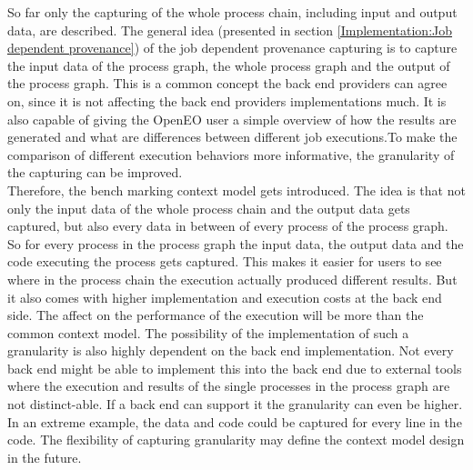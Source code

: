 \documentclass[draft,final]{vutinfth} %
\begin{document}
So far only the capturing of the whole process chain, including input and output data, are described. The general idea (presented in section \ref{Implementation:Job dependent provenance}) of the job dependent provenance capturing is to capture the input data of the process graph, the whole process graph and the output of the process graph. This is a common concept the back end providers can agree on, since it is not affecting the back end providers implementations much. It is also capable of giving the OpenEO user a simple overview of how the results are generated and what are differences between different job executions.To make the comparison of different execution behaviors more informative, the granularity of the capturing can be improved. \\
Therefore, the bench marking context model gets introduced. The idea is that not only the input data of the whole process chain and the output data gets captured, but also every data in between of every process of the process graph. So for every process in the process graph the input data, the output data and the code executing the process gets captured. This makes it easier for users to see where in the process chain the execution actually produced different results. But it also comes with higher implementation and execution costs at the back end side. The affect on the performance of the execution will be more than the common context model. The possibility of the implementation of such a granularity is also highly dependent on the back end implementation. Not every back end might be able to implement this into the back end due to external tools where the execution and results of the single  processes in the process graph are not distinct-able. If a back end can support it the granularity can even be higher. In an extreme example, the data and code could be captured for every line in the code. The flexibility of capturing granularity may define the context model design in the future.  

\backmatter

\listoffigures %

\cleardoublepage %
\listoftables %


\printindex

\printglossaries



\end{document}
